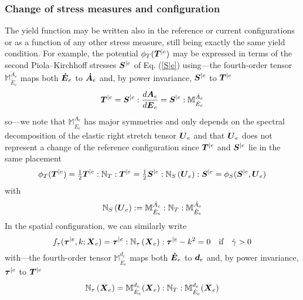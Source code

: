 \documentclass[preprint,review,12pt,sort&compress]{elsarticle}%
\renewcommand{\mathbf}[1]{\mbox{\boldmath $#1$ \unboldmath}  \!\!}
\begin{document}
\subsubsection{Change of stress measures and configuration}

The yield function may be written also in the reference or current
configurations or as a function of any other stress measure, still being
exactly the same yield condition. For example, the potential $\phi
_{T}(\mathbf{T}^{|e})$ may be expressed in terms of the second
Piola--Kirchhoff stresses $\mathbf{S}^{|e}$ of Eq. (\ref{S|e}) using---the
fourth-order tensor $\mathbb{M}_{\dot{E}_{e}}^{\dot{A}_{e}}$ maps both
$\mathbf{\dot{E}}_{e}$ to $\mathbf{\dot{A}}_{e}$ and, by power invariance,
$\mathbf{S}^{|e}$ to $\mathbf{T}^{|e}$ \cite{LatMonAPM2016}%
\begin{equation}
\mathbf{T}^{|e}=\mathbf{S}^{|e}:\frac{d\mathbf{A}_{e}}{d\mathbf{E}_{e}%
}=\mathbf{S}^{|e}:\mathbb{M}_{\dot{E}_{e}}^{\dot{A}_{e}}%
\end{equation}
so---we note that $\mathbb{M}_{\dot{E}_{e}}^{\dot{A}_{e}}$ has major
symmetries and only depends on the spectral decomposition of the elastic right
stretch tensor $\mathbf{U}_{e}$ \cite{LatMonAPM2016} and that $\mathbf{U}_{e}$
does not represent a change of the reference configuration since
$\mathbf{T}^{|e}$ and $\mathbf{S}^{|e}$ lie in the same placement%
\begin{equation}
\phi_{T}(\mathbf{T}^{|e})=\tfrac{1}{2}\mathbf{T}^{|e}:\mathbb{N}%
_{T}:\mathbf{T}^{|e}=\tfrac{1}{2}\mathbf{S}^{|e}:\mathbb{N}_{S}\left(
\mathbf{U}_{e}\right)  :\mathbf{S}^{|e}=\phi_{S}(\mathbf{S}^{|e}%
,\mathbf{U}_{e})
\end{equation}
with%
\begin{equation}
\mathbb{N}_{S}\left(  \mathbf{U}_{e}\right)  :=\mathbb{M}_{\dot{E}_{e}}%
^{\dot{A}_{e}}:\mathbb{N}_{T}:\mathbb{M}_{\dot{E}_{e}}^{\dot{A}_{e}}%
\end{equation}
In the spatial configuration, we can similarly write%
\begin{equation}
f_{\tau}(\mathbf{\tau}^{|e},k;\mathbf{X}_{e})=\mathbf{\tau}^{|e}%
:\mathbb{N}_{\tau}\left(  \mathbf{X}_{e}\right)  :\mathbf{\tau}^{|e}%
-k^{2}=0\quad\text{if}\quad\dot{\gamma}>0
\end{equation}
with---the fourth-order tensor $\mathbb{M}_{\dot{E}_{e}}^{d_{e}}$ maps both
$\mathbf{\dot{E}}_{e}$ to $\mathbf{d}_{e}$ and, by power invariance,
$\mathbf{\tau}^{|e}$ to $\mathbf{T}^{|e}$ \cite{LatMonAPM2016}%
\begin{equation}
\mathbb{N}_{\tau}\left(  \mathbf{X}_{e}\right)  =\mathbb{M}_{\dot{E}_{e}%
}^{d_{e}}(\mathbf{X}_{e}):\mathbb{N}_{T}:\mathbb{M}_{\dot{E}_{e}}^{d_{e}%
}(\mathbf{X}_{e}) \label{Ntau NT}%
\end{equation}
\end{document}

